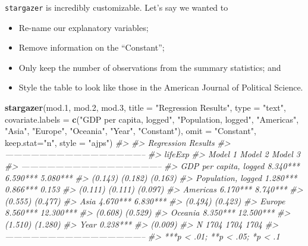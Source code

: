 \documentclass[
]{book}
\newenvironment{Shaded}{\begin{snugshade}}{\end{snugshade}}
\newcommand{\CommentTok}[1]{\textcolor[rgb]{0.56,0.35,0.01}{\textit{#1}}}
\newcommand{\DataTypeTok}[1]{\textcolor[rgb]{0.13,0.29,0.53}{#1}}
\newcommand{\FloatTok}[1]{\textcolor[rgb]{0.00,0.00,0.81}{#1}}
\newcommand{\KeywordTok}[1]{\textcolor[rgb]{0.13,0.29,0.53}{\textbf{#1}}}
\newcommand{\NormalTok}[1]{#1}
\newcommand{\StringTok}[1]{\textcolor[rgb]{0.31,0.60,0.02}{#1}}
\providecommand{\tightlist}{%
  \setlength{\itemsep}{0pt}\setlength{\parskip}{0pt}}
\begin{document}
\texttt{stargazer} is incredibly customizable. Let's say we wanted to

\begin{itemize}
\tightlist
\item
  Re-name our explanatory variables;
\item
  Remove information on the ``Constant'';
\item
  Only keep the number of observations from the summary statistics; and
\item
  Style the table to look like those in the American Journal of Political Science.
\end{itemize}

\begin{Shaded}
\begin{Highlighting}[]
\KeywordTok{stargazer}\NormalTok{(mod}\FloatTok{.1}\NormalTok{, mod}\FloatTok{.2}\NormalTok{, mod}\FloatTok{.3}\NormalTok{, }\DataTypeTok{title =} \StringTok{"Regression Results"}\NormalTok{, }\DataTypeTok{type =} \StringTok{"text"}\NormalTok{, }
          \DataTypeTok{covariate.labels  =} \KeywordTok{c}\NormalTok{(}\StringTok{"GDP per capita, logged"}\NormalTok{, }\StringTok{"Population, logged"}\NormalTok{, }\StringTok{"Americas"}\NormalTok{, }\StringTok{"Asia"}\NormalTok{, }\StringTok{"Europe"}\NormalTok{, }\StringTok{"Oceania"}\NormalTok{, }\StringTok{"Year"}\NormalTok{, }\StringTok{"Constant"}\NormalTok{), }
          \DataTypeTok{omit =} \StringTok{"Constant"}\NormalTok{, }
          \DataTypeTok{keep.stat=}\StringTok{"n"}\NormalTok{, }\DataTypeTok{style =} \StringTok{"ajps"}\NormalTok{)}
\CommentTok{#> }
\CommentTok{#> Regression Results}
\CommentTok{#> --------------------------------------------------}
\CommentTok{#>                                  lifeExp          }
\CommentTok{#>                        Model 1  Model 2   Model 3 }
\CommentTok{#> --------------------------------------------------}
\CommentTok{#> GDP per capita, logged 8.340*** 6.590*** 5.080*** }
\CommentTok{#>                        (0.143)  (0.182)   (0.163) }
\CommentTok{#> Population, logged     1.280*** 0.866***   0.153  }
\CommentTok{#>                        (0.111)  (0.111)   (0.097) }
\CommentTok{#> Americas                        6.170*** 8.740*** }
\CommentTok{#>                                 (0.555)   (0.477) }
\CommentTok{#> Asia                            4.670*** 6.830*** }
\CommentTok{#>                                 (0.494)   (0.423) }
\CommentTok{#> Europe                          8.560*** 12.300***}
\CommentTok{#>                                 (0.608)   (0.529) }
\CommentTok{#> Oceania                         8.350*** 12.500***}
\CommentTok{#>                                 (1.510)   (1.280) }
\CommentTok{#> Year                                     0.238*** }
\CommentTok{#>                                           (0.009) }
\CommentTok{#> N                        1704     1704     1704   }
\CommentTok{#> --------------------------------------------------}
\CommentTok{#> ***p < .01; **p < .05; *p < .1}
\end{Highlighting}
\end{Shaded}
\end{document}
